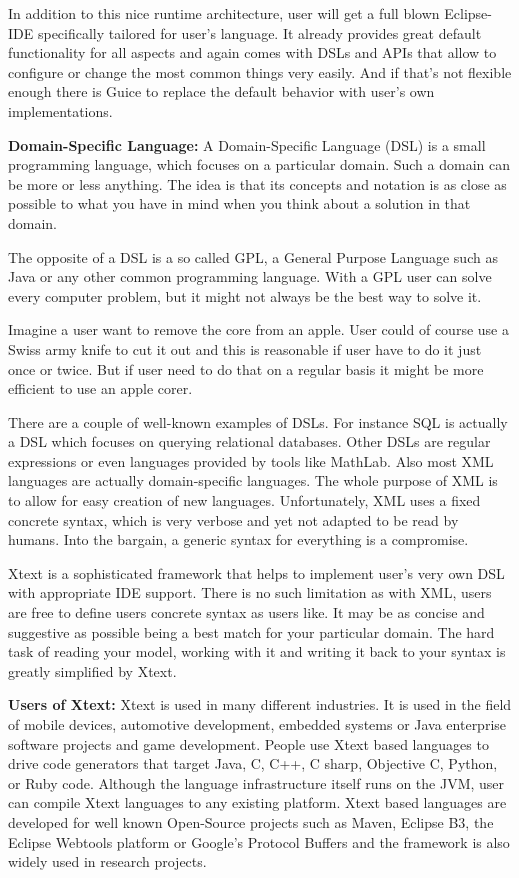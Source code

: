 \begin{itemize}
	In addition to this nice runtime architecture, user will get a full blown Eclipse-IDE specifically tailored for user's language. It already provides great default functionality for all aspects and again comes with DSLs and APIs that allow to configure or change the most common things very easily. And if that's not flexible enough there is Guice to replace the default behavior with user's own implementations.
	
	\textbf{Domain-Specific Language:}
	A Domain-Specific Language (DSL) is a small programming language, which focuses on a particular domain. Such a domain can be more or less anything. The idea is that its concepts and notation is as close as possible to what you have in mind when you think about a solution in that domain. 
		
	The opposite of a DSL is a so called GPL, a General Purpose Language such as Java or any other common programming language. With a GPL user can solve every computer problem, but it might not always be the best way to solve it.
	
	Imagine a user want to remove the core from an apple. User could of course use a Swiss army knife to cut it out and this is reasonable if user have to do it just once or twice. But if user need to do that on a regular basis it might be more efficient to use an apple corer.
	
	There are a couple of well-known examples of DSLs. For instance SQL is actually a DSL which focuses on querying relational databases. Other DSLs are regular expressions or even languages provided by tools like MathLab. Also most XML languages are actually domain-specific languages. The whole purpose of XML is to allow for easy creation of new languages. Unfortunately, XML uses a fixed concrete syntax, which is very verbose and yet not adapted to be read by humans. Into the bargain, a generic syntax for everything is a compromise.
	
	Xtext is a sophisticated framework that helps to implement user's very own DSL with appropriate IDE support. There is no such limitation as with XML, users are free to define users concrete syntax as users like. It may be as concise and suggestive as possible being a best match for your particular domain. The hard task of reading your model, working with it and writing it back to your syntax is greatly simplified by Xtext.
	
	\textbf{Users of Xtext:}
	Xtext is used in many different industries. It is used in the field of mobile devices, automotive development, embedded systems or Java enterprise software projects and game development. People use Xtext based languages to drive code generators that target Java, C, C++, C sharp, Objective C, Python, or Ruby code. Although the language infrastructure itself runs on the JVM, user can compile Xtext languages to any existing platform. Xtext based languages are developed for well known Open-Source projects such as Maven, Eclipse B3, the Eclipse Webtools platform or Google's Protocol Buffers and the framework is also widely used in research projects.
	

\end{itemize}
